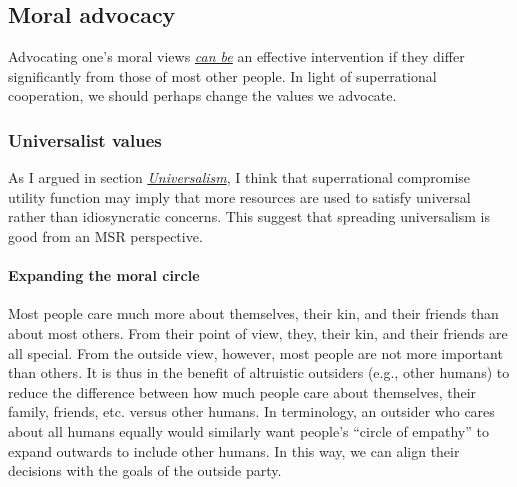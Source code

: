 \hypertarget{moral-advocacy}{\subsection{Moral
advocacy}\label{moral-advocacy}}

Advocating one's moral views
\href{http://www.utilitarian-essays.com/values-spreading.html}{\emph{can
be}} an effective intervention if they differ significantly from those
of most other people. In light of superrational cooperation, we should
perhaps change the values we advocate.

\hypertarget{universalist-values}{\subsubsection{Universalist
values}\label{universalist-values}}

As I argued in section
\protect\hyperlink{universalism}{\emph{Universalism}}, I think that
superrational compromise utility function may imply that more resources
are used to satisfy universal rather than idiosyncratic concerns. This
suggest that spreading universalism is good from an MSR perspective.

\paragraph{Expanding the moral circle}\label{expanding-the-moral-circle}

Most people care much more about themselves, their kin, and their
friends than about most others. From their point of view, they, their
kin, and their friends are all special. From the outside view, however,
most people are not more important than others. It is thus in the
benefit of altruistic outsiders (e.g., other humans) to reduce the
difference between how much people care about themselves, their family,
friends, etc. versus other humans. In
\parencite{Singer2011-yx} terminology, an outsider who cares
about all humans equally would similarly want people's ``circle of
empathy'' to expand outwards to include other humans. In this way, we
can align their decisions with the goals of the outside party.

